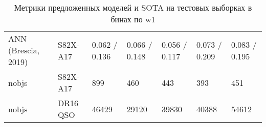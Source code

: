 \begin{table*}
\begin{tabular}{lllllll}
          ANN (Brescia, 2019) &  S82X-A17 &                    0.062 / 0.136 &                    0.066 / 0.148 &                    0.056 / 0.117 &                    0.073 / 0.209 &                    0.083 / 0.195 \\
                        nobjs &  S82X-A17 &                              899 &                              460 &                              443 &                              393 &                              451 \\
                        nobjs &  DR16 QSO &                            46429 &                            29120 &                            39830 &                            40388 &                            54612 \\
    \hline
    \end{tabular}
    
    \caption{Метрики предложенных моделей и SOTA на тестовых выборках в бинах по w1}
    \label{tab:metrics-rmag}
\end{table*}


